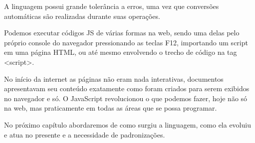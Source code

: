 \documentclass[
	12pt,				%
	openright,			%
	twoside,			%
	a4paper,			%
	english,			%
	brazil				%
	]{abntex2}
\begin{document}
A linguagem possui grande tolerância a erros, uma vez que conversões automáticas são realizadas durante suas operações.

Podemos executar códigos JS de várias formas na web, sendo uma delas pelo próprio console do navegador pressionando as teclas F12, importando um script em uma página HTML, ou até mesmo envolvendo o trecho de código na tag <script>.

No início da internet as páginas não eram nada interativas, documentos apresentavam seu conteúdo exatamente como foram criados para serem exibidos no navegador e só. O JavaScript revolucionou o que podemos fazer, hoje não só na web, mas praticamente em todas as áreas que se possa programar. 

No próximo capítulo abordaremos de como surgiu a linguagem, como ela evoluiu e atua no presente e a necessidade de padronizações.
\end{document}
